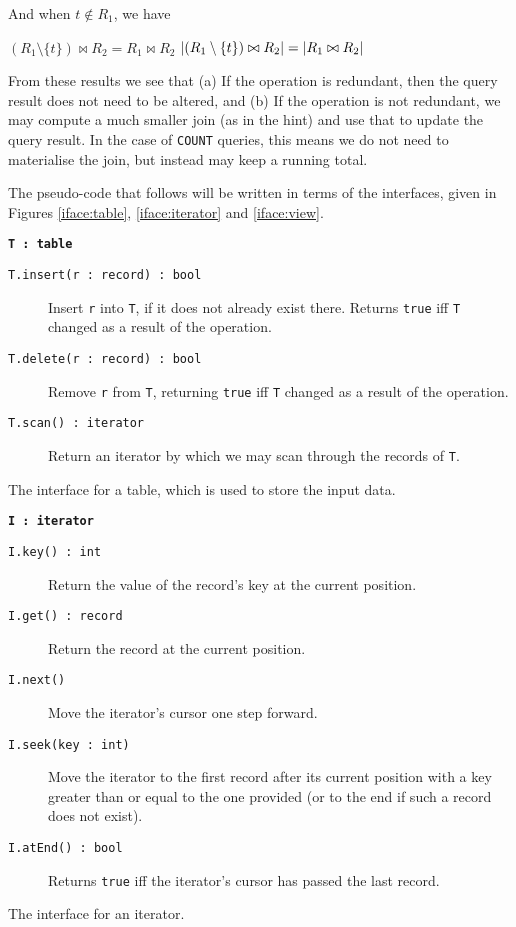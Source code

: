 And when $t\notin R_1$, we have
\begin{itemize}
  \step[\imps] $(R_1\setminus\{t\})\bowtie R_2 = R_1\bowtie R_2$
  \step[\imps] $\lvert(R_1\setminus\{t\})\bowtie R_2\rvert = \lvert R_1\bowtie R_2\rvert$
\end{itemize}

From these results we see that (a) If the operation is redundant, then the query result does not need to be altered, and (b) If the operation is not redundant, we may compute a much smaller join (as in the hint) and use that to update the query result. In the case of \texttt{COUNT} queries, this means we do not need to materialise the join, but instead may keep a running total.

The pseudo-code that follows will be written in terms of the interfaces, given in Figures \ref{iface:table}, \ref{iface:iterator} and \ref{iface:view}.

\begin{marginfigure}
  \textbf{\texttt{T\,:\,table}}
  \begin{description}
    \item[\texttt{T.insert(r\,:\,record)\,:\,bool}]
      Insert \texttt{r} into \texttt{T}, if it does not already exist there. Returns \texttt{true} iff \texttt{T} changed as a result of the operation.
    \item[\texttt{T.delete(r\,:\,record)\,:\,bool}]
      Remove \texttt{r} from \texttt{T}, returning \texttt{true} iff \texttt{T} changed as a result of the operation.
    \item[\texttt{T.scan()\,:\,iterator}]
      Return an iterator by which we may scan through the records of \texttt{T}.
  \end{description}
  \caption{The interface for a table, which is used to store the input data.}\label{iface:table}
\end{marginfigure}

\begin{marginfigure}
  \textbf{\texttt{I\,:\,iterator}}
  \begin{description}
    \item[\texttt{I.key()\,:\,int}]
      Return the value of the record's key at the current position.
    \item[\texttt{I.get()\,:\,record}]
      Return the record at the current position.
    \item[\texttt{I.next()}]
      Move the iterator's cursor one step forward.
    \item[\texttt{I.seek(key\,:\,int)}]
      Move the iterator to the first record after its current position with a key greater than or equal to the one provided (or to the end if such a record does not exist).
    \item[\texttt{I.atEnd()\,:\,bool}]
      Returns \texttt{true} iff the iterator's cursor has passed the last record.
  \end{description}
  \caption{The interface for an iterator.}\label{iface:iterator}
\end{marginfigure}

